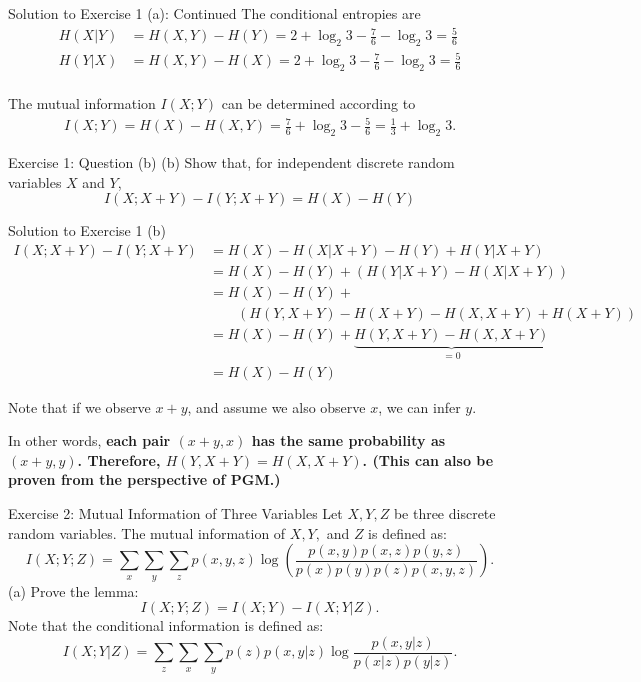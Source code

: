 \documentclass[aspectratio=169]{beamer}
\newcommand{\HX}{H(X)}
\newcommand{\HY}{H(Y)}
\newcommand{\HXY}{H(X, Y)}
\newcommand{\HXcY}{H(X | Y)}
\newcommand{\HYcX}{H(Y|X)}
\newcommand{\IXY}{I(X;Y)}
\begin{document}
\begin{frame}{Solution to Exercise 1 (a): Continued}
	The conditional entropies are
	\begin{align*}
		\HXcY &= \HXY - \HY = 2 + \log_2 3 - \frac{7}{6} - \log_2 3 = \frac{5}{6} \\
		\HYcX &= \HXY - \HX = 2 + \log_2 3 - \frac{7}{6} - \log_2 3 = \frac{5}{6} \\
	\end{align*}
	
	The mutual information $\IXY$ can be determined according to
	\begin{align*}
		\IXY = \HX - \HXY = \frac{7}{6} + \log_2 3 - \frac{5}{6} = \frac{1}{3} + \log_2 3.
	\end{align*}
\end{frame}


\begin{frame}{Exercise 1: Question (b)}
	(b) Show that, for independent discrete random variables $X$ and $Y$,
	$$I(X; X + Y) - I(Y; X + Y) = \HX - \HY$$
\end{frame}

\begin{frame}{Solution to Exercise 1 (b)}
\small
	\begin{align*}
		I(X; X+ Y) - I(Y; X+Y) 
		&= \HX - H(X | X + Y) - \HY + H(Y | X + Y) \\
		&= \HX - \HY  + (H(Y| X+Y) - H(X| X+Y)) \\
		&= \HX - \HY + \\
		&\qquad (H(Y, X+Y) - H(X+Y) - H(X, X+Y) + H(X+Y)) \\
		&= \HX - \HY + \underbrace{H(Y, X+Y) - H(X, X+Y)}_{=0} \\
		&= \HX - \HY
	\end{align*}

Note that if we observe $x+y$, and assume we also observe $x$, we can infer $y$.	 

In other words, \textbf{each pair $(x+y, x)$ has the same probability as $(x+y, y)$. Therefore, $H(Y, X+Y) = H(X, X+Y)$. (This can also be proven from the perspective of PGM.)}

\end{frame}

\begin{frame}{Exercise 2: Mutual Information of Three Variables}
	Let $X, Y, Z$ be three discrete random variables. The mutual information of $X, Y,$ and $Z$ is defined as:
	$$I(X; Y; Z) = \sum_x \sum_y \sum_z p(x, y, z) \log \left( \frac{p(x,y) p(x,z) p(y,z)}{p(x) p(y) p(z) p(x,y,z)}\right).$$
	(a) Prove the lemma:  $$I(X; Y; Z) = I(X; Y) - I(X; Y |Z).$$ Note that the conditional information is defined as: $$I(X; Y | Z) = \sum_z \sum_x \sum_y p(z) p(x, y |z) \log \frac{p(x, y | z)}{p(x|z) p(y|z)}.$$
\end{frame}
\end{document}

